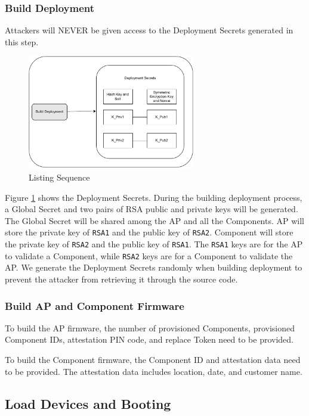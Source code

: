 \documentclass[11pt,oneside,onecolumn,letterpaper]{article}
\begin{document}
	\subsubsection{Build Deployment}
	Attackers will NEVER be given access to the Deployment Secrets generated in this step.
	\begin{figure}[h]
		\centering
		\includegraphics[width=0.65\textwidth]{pics/secret.pdf}
		\caption{Listing Sequence}
		\label{fig:secret}
	\end{figure}
	
	Figure \ref{fig:secret} shows the Deployment Secrets.
	During the building deployment process,
	a Global Secret and two pairs of RSA public and private keys will be generated.
	The Global Secret will be shared among the AP and all the Components.
	AP will store the private key of \texttt{RSA1} and the public key of \texttt{RSA2}.
	Component will store the private key of \texttt{RSA2} and the public key of \texttt{RSA1}.
	The \texttt{RSA1} keys are for the AP to validate a Component,
	while \texttt{RSA2} keys are for a Component to validate the AP.
	We generate the Deployment Secrets randomly when building deployment to prevent the attacker from retrieving it through the source code.
	
	\subsubsection{Build AP and Component Firmware}
	To build the AP firmware,
	the number of provisioned Components,
	provisioned Component IDs,
	attestation PIN code,
	and replace Token need to be provided.
	
	To build the Component firmware,
	the Component ID and attestation data need to be provided.
	The attestation data includes location,
	date,
	and customer name.
	
	\subsection{Load Devices and Booting}
\end{document}
